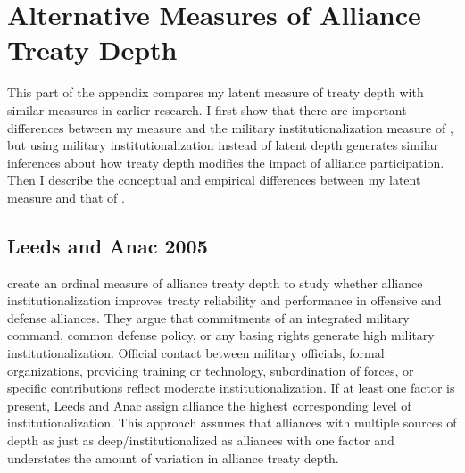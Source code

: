 \documentclass[12pt]{article}
\begin{document}
\section{Alternative Measures of Alliance Treaty Depth}

This part of the appendix compares my latent measure of treaty depth with similar measures in earlier research.  
I first show that there are important differences between my measure and the military institutionalization measure of \citet{LeedsAnac2005}, but using military institutionalization instead of latent depth generates similar inferences about how treaty depth modifies the impact of alliance participation. 
Then I describe the conceptual and empirical differences between my latent measure and that of \citet{BensonClinton2016}.


\subsection{Leeds and Anac 2005}


\citet{LeedsAnac2005} create an ordinal measure of alliance treaty depth to study whether alliance institutionalization improves treaty reliability and performance in offensive and defense alliances. 
They argue that commitments of an integrated military command, common defense policy, or any basing rights generate high military institutionalization. 
Official contact between military officials, formal organizations, providing training or technology, subordination of forces, or specific contributions reflect moderate institutionalization. 
If at least one factor is present, Leeds and Anac assign alliance the highest corresponding level of institutionalization. 
This approach assumes that alliances with multiple sources of depth as just as deep/institutionalized as alliances with one factor and understates the amount of variation in alliance treaty depth. 
\end{document}
